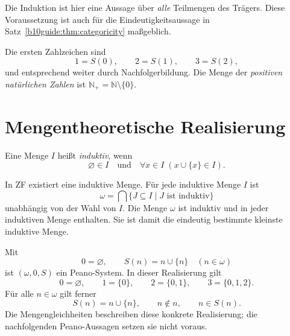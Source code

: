 Die Induktion ist hier eine Aussage über \emph{alle} Teilmengen des
Trägers. Diese Voraussetzung ist auch für die Eindeutigkeitsaussage
in Satz~\ref{b10guide:thm:categoricity} maßgeblich.

\begin{definition}
\label{b10guide:def:numerals}
Die ersten Zahlzeichen sind
\[
 1=S(0),\qquad 2=S(1),\qquad 3=S(2),
\]
und entsprechend weiter durch Nachfolgerbildung.
Die Menge der \emph{positiven natürlichen Zahlen} ist
$\mathbb N_+=\mathbb N\setminus\{0\}$.
\end{definition}

\section{Mengentheoretische Realisierung}

\begin{definition}
\label{b10guide:def:inductiveset}
Eine Menge $I$ heißt \emph{induktiv}, wenn
\[
 \varnothing\in I
 \quad\text{und}\quad
 \forall x\in I\;(x\cup\{x\}\in I).
\]
\end{definition}

\begin{theorem}
\label{b10guide:thm:omega}
In ZF existiert eine induktive Menge. Für jede induktive Menge $I$
ist
\[
 \omega=\bigcap\{J\subseteq I\mid J\text{ ist induktiv}\}
\]
unabhängig von der Wahl von $I$. Die Menge $\omega$ ist induktiv und
in jeder induktiven Menge enthalten. Sie ist damit die eindeutig
bestimmte kleinste induktive Menge.
\end{theorem}

\begin{theorem}
\label{b10guide:thm:von-neumann}
Mit
\[
 0=\varnothing,\qquad S(n)=n\cup\{n\}\quad(n\in\omega)
\]
ist $(\omega,0,S)$ ein Peano-System.
In dieser Realisierung gilt
\[
 0=\varnothing,\qquad 1=\{0\},\qquad
 2=\{0,1\},\qquad 3=\{0,1,2\}.
\]
Für alle $n\in\omega$ gilt ferner
\[
 S(n)=n\cup\{n\},\qquad n\notin n,\qquad n\in S(n).
\]
Die Mengengleichheiten beschreiben diese konkrete Realisierung;
die nachfolgenden Peano-Aussagen setzen sie nicht voraus.
\end{theorem}
